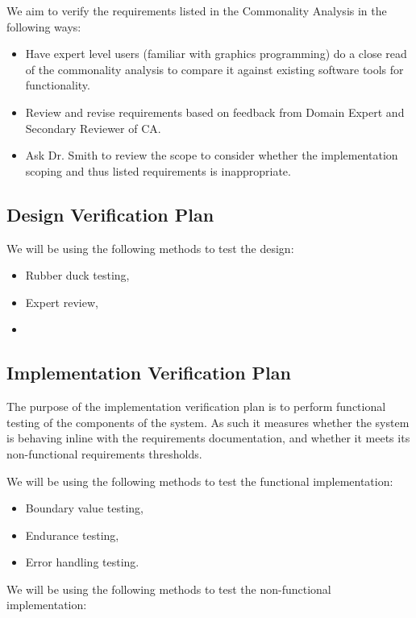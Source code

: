 \documentclass[12pt, titlepage]{article}
\begin{document}
We aim to verify the requirements listed in the Commonality Analysis in the 
following ways:

\begin{itemize}
	\item Have expert level users (familiar with graphics programming) do a 
	close read of the commonality analysis to compare it against existing 
	software tools for functionality.
	\item Review and revise requirements based on feedback from Domain Expert 
	and Secondary Reviewer of CA.
	\item Ask Dr. Smith to review the scope to consider whether the 
	implementation scoping and thus listed requirements is inappropriate.
\end{itemize}

\subsection{Design Verification Plan}

We will be using the following methods to test the design:

\begin{itemize}
	\item Rubber duck testing,
	\item Expert review,
	\item
\end{itemize}

\subsection{Implementation Verification Plan}
The purpose of the implementation verification plan is to perform functional 
testing of the components of the system. As such it measures whether the system 
is behaving inline with the requirements documentation, and whether it meets 
its non-functional requirements thresholds.

We will be using the following methods to test the functional implementation:

\begin{itemize}
	\item Boundary value testing,
	\item Endurance testing,
	\item Error handling testing.
\end{itemize}

We will be using the following methods to test the non-functional 
implementation:
\end{document}
